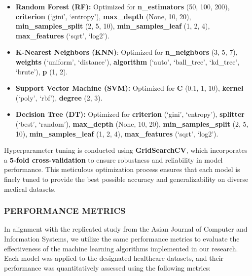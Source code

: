 \documentclass[11pt]{article}
\begin{document}
\begin{itemize}
\item
  \textbf{Random Forest (RF):} Optimized for \textbf{n\_estimators} (50,
  100, 200), \textbf{criterion} (`gini', `entropy'), \textbf{max\_depth}
  (None, 10, 20), \textbf{min\_samples\_split} (2, 5, 10),
  \textbf{min\_samples\_leaf} (1, 2, 4), \textbf{max\_features} (`sqrt',
  `log2').
\item
  \textbf{K-Nearest Neighbors (KNN)}: Optimized for
  \textbf{n\_neighbors} (3, 5, 7), \textbf{weights} (`uniform',
  `distance'), \textbf{algorithm} (`auto', `ball\_tree', `kd\_tree',
  `brute'), \textbf{p} (1, 2).
\item
  \textbf{Support Vector Machine (SVM):} Optimized for \textbf{C} (0.1,
  1, 10), \textbf{kernel} (`poly', `rbf'), \textbf{degree} (2, 3).
\item
  \textbf{Decision Tree (DT):} Optimized for \textbf{criterion} (`gini',
  `entropy'), \textbf{splitter} (`best', `random'), \textbf{max\_depth}
  (None, 10, 20), \textbf{min\_samples\_split} (2, 5, 10),
  \textbf{min\_samples\_leaf} (1, 2, 4), \textbf{max\_features} (`sqrt',
  `log2').
\end{itemize}

Hyperparameter tuning is conducted using \textbf{GridSearchCV}, which
incorporates a \textbf{5-fold cross-validation} to ensure robustness and
reliability in model performance. This meticulous optimization process
ensures that each model is finely tuned to provide the best possible
accuracy and generalizability on diverse medical datasets.

    \hypertarget{performance-metrics}{%
\subsubsection{PERFORMANCE METRICS}\label{performance-metrics}}

    In alignment with the replicated study from the Asian Journal of
Computer and Information Systems, we utilize the same performance
metrics to evaluate the effectiveness of the machine learning algorithms
implemented in our research. Each model was applied to the designated
healthcare datasets, and their performance was quantitatively assessed
using the following metrics:
\end{document}
